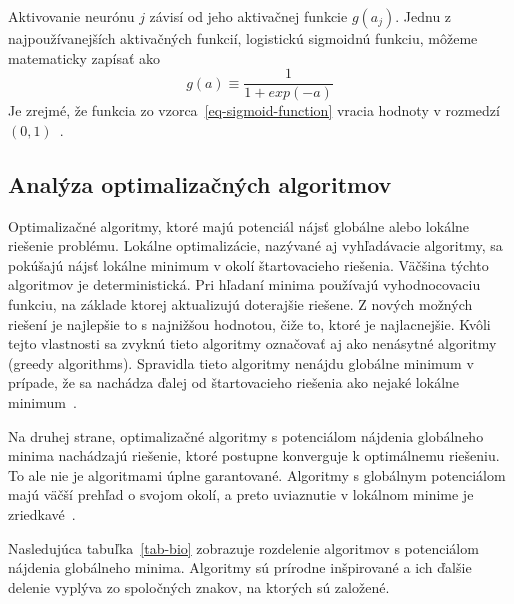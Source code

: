 \documentclass[a4paper,slovak,12pt,appendix]{article}
\begin{document}
Aktivovanie neurónu $j$ závisí od jeho aktivačnej funkcie $g(a_j)$. Jednu
z najpoužívanejších aktivačných funkcií, logistickú sigmoidnú funkciu, môžeme
matematicky zapísať ako
\begin{equation}
  g(a) \equiv \frac{1}{1 + exp(-a)}
  \label{eq-sigmoid-function}
\end{equation}
Je zrejmé, že funkcia zo vzorca~\ref{eq-sigmoid-function} vracia hodnoty
v rozmedzí $(0,1)$~\cite{Merz1998}.


\subsection{Analýza optimalizačných algoritmov}
Optimalizačné algoritmy, ktoré majú potenciál nájsť globálne alebo lokálne
riešenie problému. Lokálne optimalizácie, nazývané aj vyhľadávacie algoritmy,
sa pokúšajú nájsť lokálne minimum v okolí štartovacieho riešenia. Väčšina
týchto algoritmov je deterministická. Pri hľadaní minima používajú
vyhodnocovaciu funkciu, na základe ktorej aktualizujú doterajšie riešene.
Z nových možných riešení je najlepšie to s najnižšou hodnotou, čiže to, ktoré
je najlacnejšie. Kvôli tejto vlastnosti sa zvyknú tieto algoritmy označovať aj
ako nenásytné algoritmy (greedy algorithms). Spravidla tieto algoritmy nenájdu
globálne minimum v prípade, že sa nachádza ďalej od štartovacieho riešenia ako
nejaké lokálne minimum~\cite{Sen1995}.

Na druhej strane, optimalizačné algoritmy s potenciálom nájdenia globálneho
minima nachádzajú riešenie, ktoré postupne konverguje k optimálnemu riešeniu.
To ale nie je algoritmami úplne garantované. Algoritmy s globálnym
potenciálom majú väčší prehľad o svojom okolí, a preto uviaznutie v lokálnom
minime je zriedkavé~\cite{Sen1995}.

Nasledujúca tabuľka~\ref{tab-bio} zobrazuje rozdelenie algoritmov
s potenciálom nájdenia globálneho minima. Algoritmy sú prírodne inšpirované
a ich ďalšie delenie vyplýva zo spoločných znakov, na ktorých sú založené.
\end{document}
